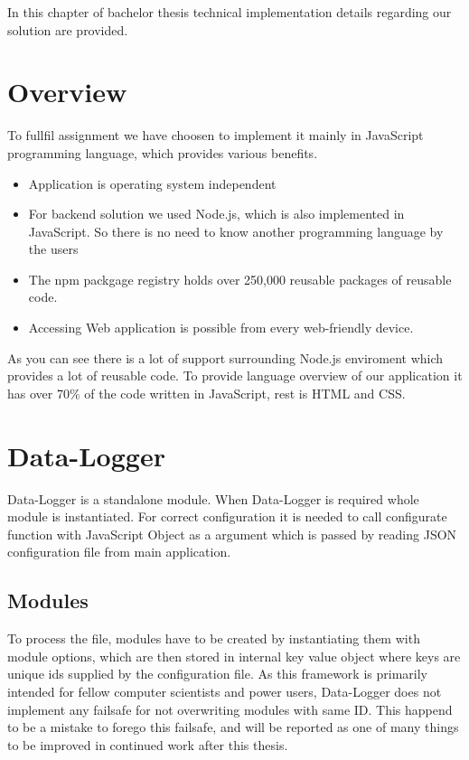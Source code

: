 In this chapter of bachelor thesis technical implementation details regarding our solution are provided.
\section{Overview} %
\label{sec:overview}
To fullfil assignment we have choosen to implement it mainly in JavaScript programming language, which provides various benefits.
\begin{itemize}
\item Application is operating system independent
\item For backend solution we used Node.js, which is also implemented in JavaScript. So there is no need to know another programming language by the users
\item The npm packgage registry holds over 250,000 reusable packages of reusable code.
\item Accessing Web application is possible from every web-friendly device.
\end{itemize}
As you can see there is a lot of support surrounding Node.js enviroment which provides a lot of reusable code. To provide language overview of our application it has over 70\% of the code written in JavaScript, rest is HTML and CSS.
\section{Data-Logger} %
\label{sec:data_logger}
Data-Logger is a standalone module. When Data-Logger is required whole module is instantiated. For correct configuration it is needed to call configurate function with JavaScript Object as a argument which is passed by reading JSON configuration file from main application.
\subsection{Modules} %
\label{sub:modules}
To process the file, modules have to be created by instantiating them with module options, which are then stored in internal key value object where keys are unique ids supplied by the configuration file. As this framework is primarily intended for fellow computer scientists and power users, Data-Logger does not implement any failsafe for not overwriting modules with same ID. This happend to be a mistake to forego this failsafe, and will be reported as one of many things to be improved in continued work after this thesis.

